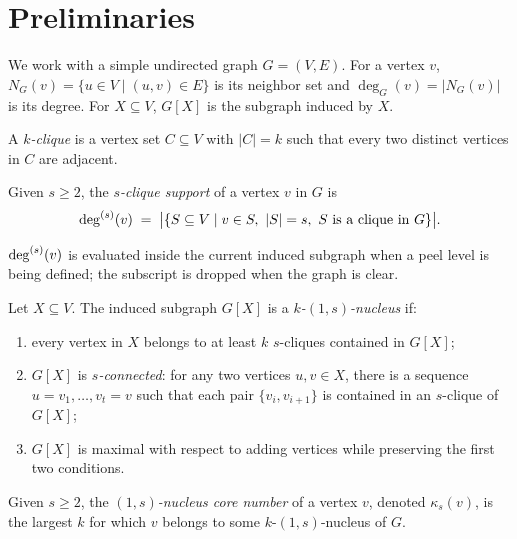 \section{Preliminaries}\label{sec:prelim}

We work with a simple undirected graph $G=(V,E)$.
%
For a vertex $v$, $N_G(v)=\{u\in V\mid (u,v)\in E\}$ is its neighbor set and $\deg_G(v)=|N_G(v)|$ is its degree.
%
For $X\subseteq V$, $G[X]$ is the subgraph induced by $X$.

\begin{definition}[$k$-Clique]\label{def:k-clique}
A \emph{$k$-clique} is a vertex set $C\subseteq V$ with $|C|=k$ such that every two distinct vertices in $C$ are adjacent.
\end{definition}

\begin{definition}\label{def:s-supp}
Given $s\ge2$, the \emph{$s$-clique support} of a vertex $v$ in $G$ is
\[
  \deg^{(s)}(v) \;=\; \bigl|\{S\subseteq V\mid v\in S,\ |S|=s,\ S\text{ is a clique in }G\}\bigr|.
\]
\end{definition}

$\deg^{(s)}(v)$ is evaluated inside the current induced subgraph when a peel level is being defined; the subscript is dropped when the graph is clear.

\begin{definition}[$k$-$(1,s)$-Nucleus]\label{def:nucleus}
Let $X\subseteq V$.
%
The induced subgraph $G[X]$ is a \emph{$k$-$(1,s)$-nucleus} if:
\begin{enumerate}[leftmargin=*]
  \item every vertex in $X$ belongs to at least $k$ $s$-cliques contained in $G[X]$;
  \item $G[X]$ is \emph{$s$-connected}: for any two vertices $u,v\in X$, there is a sequence $u=v_1,\ldots,v_t=v$ such that each pair $\{v_i,v_{i+1}\}$ is contained in an $s$-clique of $G[X]$;
  \item $G[X]$ is maximal with respect to adding vertices while preserving the first two conditions.
\end{enumerate}
\end{definition}

\begin{definition}\label{def:core}
Given $s\ge2$, the \emph{$(1,s)$-nucleus core number} of a vertex $v$, denoted $\kappa_s(v)$, is the largest $k$ for which $v$ belongs to some $k$-$(1,s)$-nucleus of $G$.
\end{definition}

